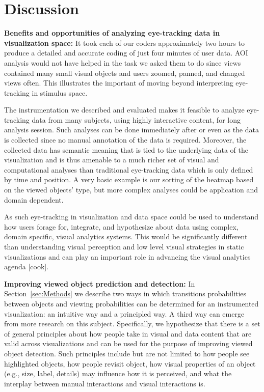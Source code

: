 \section{Discussion}
\label{sec:Discussion}

\textbf{Benefits and opportunities of analyzing eye-tracking data in visualization space:} It took each of our coders approximately two hours to produce a detailed and accurate coding of just four minutes of user data. AOI analysis would not have helped in the task we asked them to do since views contained many small visual objects and users zoomed, panned, and changed views often. This illustrates the important of moving beyond interpreting eye-tracking in stimulus space.

The instrumentation we described and evaluated makes it feasible to analyze eye-tracking data from many subjects, using highly interactive content, for long analysis session. Such analyses can be done immediately after or even as the data is collected since no manual annotation of the data is required. Moreover, the collected data has semantic meaning that is tied to the underlying data of the visualization and is thus amenable to a much richer set of visual and computational analyses than traditional eye-tracking data which is only defined by time and position. A very basic example is our sorting of the heatmap based on the viewed objects' type, but more complex analyses could be application and domain dependent.

As such eye-tracking in visualization and data space could be used to understand how users forage for, integrate, and hypothesize about data using complex, domain specific, visual analytics systems. This would be significantly different than understanding visual perception and low level visual strategies in static visualizations and can play an important role in advancing the visual analytics agenda [cook]. 

\textbf{Improving viewed object prediction and detection:} In Section~\ref{sec:Methods} we describe two ways in which transitions probabilities between objects and viewing probabilities can be determined for an instrumented visualization: an intuitive way and a principled way. A third way can emerge from more research on this subject. Specifically, we hypothesize that there is a set of general principles about how people take in visual and data content that are valid across visualizations and can be used for the purpose of improving viewed object detection. Such principles include but are not limited to how people see highlighted objects, how people revisit object, how visual properties of an object (e.g., size, label, details) may influence how it is perceived, and what the interplay between manual interactions and visual interactions is.


